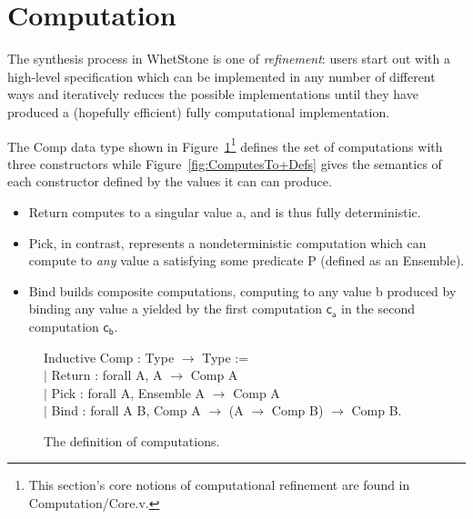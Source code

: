\section{Computation}

The synthesis process in WhetStone is one of \textit{refinement}:
users start out with a high-level specification which can be
implemented in any number of different ways and iteratively reduces
the possible implementations until they have produced a (hopefully
efficient) fully computational implementation.

The \textsf{Comp} data type shown in
Figure~\ref{fig:Comp+Defs}\footnote{This section's core notions of
  computational refinement are found in \textsf{Computation/Core.v}.}
defines the set of computations with three constructors while
Figure~\ref{fig:ComputesTo+Defs} gives the semantics of each
constructor defined by the values it can can produce.

\begin{itemize}
\item \textsf{Return} computes to a singular value \textsf{a}, and is
  thus fully deterministic.
\item\textsf{Pick}, in contrast, represents a nondeterministic
  computation which can compute to \textit{any} value \textsf{a}
  satisfying some predicate \textsf{P} (defined as an
  \textsf{Ensemble}).
\item \textsf{Bind} builds composite computations, computing to any
  value \textsf{b} produced by binding any value \textsf{a} yielded by
  the first computation $\mathsf{c_a}$ in the second computation
  $\mathsf{c_b}$.
\end{itemize}



\begin{figure}[h]
  \begin{tabbedcodeblock}
    Inductive Comp : Type $\rightarrow$ Type := \+\\
    $|$ Return : forall A, A $\rightarrow$ Comp A \\
    $|$ Pick : forall A, Ensemble A $\rightarrow$ Comp A \\
    $|$ Bind : forall A B, Comp A $\rightarrow$ (A $\rightarrow$ Comp B) $\rightarrow$ Comp B.
  \end{tabbedcodeblock}
  \caption{The definition of computations. }
  \label{fig:Comp+Defs}
\end{figure}


